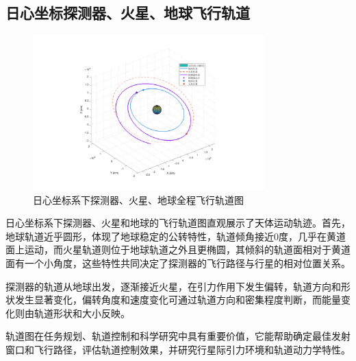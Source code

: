 \documentclass[12pt,a4paper]{article}
\begin{document}
\subsection{日心坐标探测器、火星、地球飞行轨道}

\begin{figure}[H]
    \centering
    \includegraphics[width=0.8\textwidth]{images/solar.png}
    \caption{日心坐标系下探测器、火星、地球全程飞行轨道图}
\end{figure}

日心坐标系下探测器、火星和地球的飞行轨道图直观展示了天体运动轨迹。首先，地球轨道近乎圆形，体现了地球稳定的公转特性，轨道倾角接近0度，几乎在黄道面上运动，而火星轨道则位于地球轨道之外且更椭圆，其倾斜的轨道面相对于黄道面有一个小角度，这些特性共同决定了探测器的飞行路径与行星的相对位置关系。

探测器的轨道从地球出发，逐渐接近火星，在引力作用下发生偏转，轨道方向和形状发生显著变化，偏转角度和速度变化可通过轨道方向和密集程度判断，而能量变化则由轨道形状和大小反映。

轨道图在任务规划、轨道控制和科学研究中具有重要价值，它能帮助确定最佳发射窗口和飞行路径，评估轨道控制效果，并研究行星际引力环境和轨道动力学特性。
\end{document}
